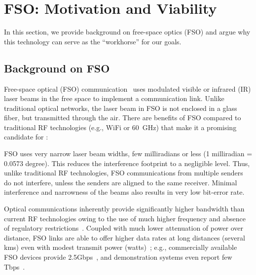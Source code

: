 \section{FSO: Motivation and Viability} 
\label{sec:fso}


In this section, we provide background on free-space optics
(FSO) and argue why this technology can serve as the ``workhorse''  for our goals.

\subsection{Background on FSO} 

Free-space optical (FSO) communication~\cite{kedar} uses modulated
visible or infrared (IR) laser beams in the free space to implement a
communication link. Unlike traditional optical networks, the laser
beam in FSO is not enclosed in a glass fiber, but transmitted through
the air. There are  benefits of FSO compared to
traditional RF technologies (e.g., WiFi or 60~GHz) that make it a
promising candidate for \DCs:

 FSO uses very narrow laser beam
widths,  few milliradians or less (1
milliradian = 0.0573 degree). This reduces the interference footprint to a
negligible level.  Thus, unlike traditional RF technologies, FSO communications
from multiple senders do not interfere, unless the senders are aligned to the
same receiver. Minimal interference and narrowness of the beams also results in
very low bit-error rate.

  Optical communications inherently
provide significantly higher bandwidth than  current RF technologies owing to
the use of much higher frequency and absence of regulatory
restrictions~\cite{kedar}. Coupled with much lower attenuation of power over
distance, FSO links are able to offer higher data rates at long distances
(several kms) even with modest transmit power
(watts)~\cite{kedar}; e.g., commercially available FSO devices 
 provide 2.5Gbps~\cite{fsona}, and demonstration systems even report 
 few Tbps~\cite{mustafa2013reintroducing}.

